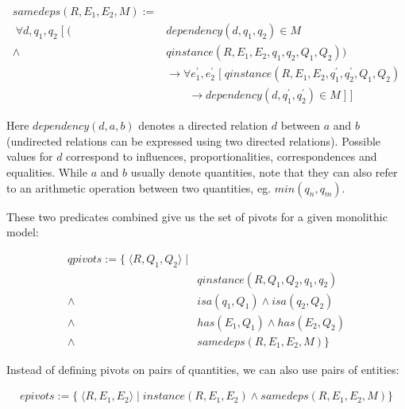 \documentclass{article} %
\begin{document}
\begin{align*}
samedeps(R, E_1, E_2, M) := \\
	\; \forall d, q_1, q_2 \; [ \; 
	(&dependency(d, q_1, q_2) \in M \\
	\land \; &qinstance(R, E_1, E_2, q_1, q_2, Q_1, Q_2)) \\
	& 	\rightarrow \forall e^\prime_1, e^\prime_2 \; [ \;
	 qinstance(R, E_1, E_2, q^\prime_1, q^\prime_2, Q_1, Q_2) \\
	& \qquad \rightarrow dependency(d, q^\prime_1, q^\prime_2) \in M \; ] \; ]
\end{align*}

Here $dependency(d, a, b)$ denotes a directed relation $d$ between $a$
and $b$ (undirected relations can be expressed using two directed relations).
Possible values for $d$ correspond to influences, proportionalities,
correspondences and equalities. While $a$ and $b$ usually denote quantities,
note that they can also refer to an arithmetic operation between two
quantities, eg. $min(q_n, q_m)$.

These two predicates combined give us the set of pivots for a given
monolithic model:

\begin{align*}
qpivots := \{ \; \langle R, Q_1, Q_2 \rangle \; | \\
	\; &qinstance(R, Q_1, Q_2, q_1, q_2) \\
	\land \; &isa(q_1, Q_1) \land isa(q_2, Q_2) \\
	\land \; &has(E_1, Q_1) \land has(E_2, Q_2) \\
	\land \; &samedeps(R, E_1, E_2, M) \} 
\end{align*}

Instead of defining pivots on pairs of quantities, we can also use pairs
of entities:

\begin{align*}
epivots := \{ \; \langle R, E_1, E_2 \rangle \; | 
	\; instance(R, E_1, E_2) 
	\land samedeps(R, E_1, E_2, M) \} 
\end{align*}
\end{document}
